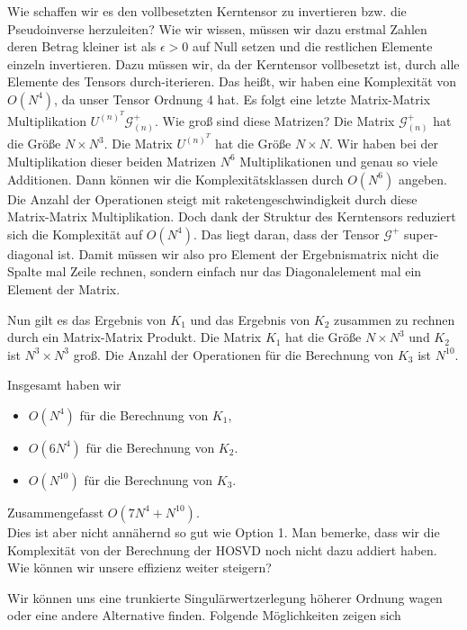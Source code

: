 Wie schaffen wir es den vollbesetzten Kerntensor zu invertieren bzw. die Pseudoinverse herzuleiten? Wie wir wissen, müssen wir dazu erstmal Zahlen deren Betrag kleiner ist als $\epsilon > 0$ auf Null setzen und die restlichen Elemente einzeln invertieren. 
Dazu müssen wir, da der Kerntensor vollbesetzt ist, durch alle Elemente des Tensors durch-iterieren. Das heißt, wir haben eine Komplexität von $O(N^4)$, da unser Tensor Ordnung 4 hat.
Es folgt eine letzte Matrix-Matrix Multiplikation $U^{ (n) ^{T} }  \mathscr{G}^{+}_{(n)}$. Wie groß sind diese Matrizen? Die Matrix $ \mathscr{G}^{+}_{(n)}$ hat die Größe $N \times N^3$. Die Matrix  $U^{ (n) ^{T} }$ hat die Größe $N \times N$.  Wir haben bei der Multiplikation dieser beiden Matrizen $N^6$ Multiplikationen und genau so viele Additionen. Dann können wir die Komplexitätsklassen durch $O(N^6)$ angeben. Die Anzahl der Operationen steigt mit raketengeschwindigkeit durch diese Matrix-Matrix Multiplikation. Doch dank der Struktur des Kerntensors reduziert sich die Komplexität auf $O(N^4)$. Das liegt daran, dass der Tensor $ \mathscr{G}^{+}$ super-diagonal ist. Damit müssen wir also pro Element der Ergebnismatrix nicht die Spalte mal Zeile rechnen, sondern einfach nur das Diagonalelement mal ein Element der Matrix. 

Nun gilt es das Ergebnis von $K_1$ und das Ergebnis von $K_2$ zusammen zu rechnen durch ein Matrix-Matrix Produkt. Die Matrix $K_1$ hat die Größe $N \times N^3$ und $K_2$ ist $N^3 \times N^3$ groß. 
Die Anzahl der Operationen für die Berechnung von $K_3$ ist $N^{10}$.

Insgesamt haben wir
\begin{itemize}
\item $O(N^4)$ für die Berechnung von $K_1$,
\item $O(6N^4)$ für die Berechnung von $K_2$.
\item $O(N^{10})$ für die Berechnung von $K_3$.
\end{itemize}

Zusammengefasst $O(7N^4+N^{10})$. \\ Dies ist aber nicht annähernd so gut wie Option 1. Man bemerke, dass wir die Komplexität von der Berechnung der HOSVD noch nicht dazu addiert haben. Wie können wir unsere effizienz weiter steigern?

Wir können uns eine trunkierte Singulärwertzerlegung höherer Ordnung  wagen oder eine andere Alternative finden. Folgende Möglichkeiten zeigen sich

